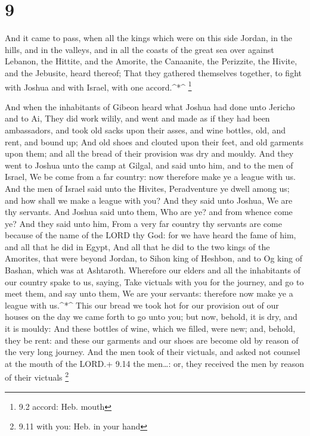 \hypertarget{section-8}{%
\section{9}\label{section-8}}

 And it came to pass, when all the kings which were on this
side Jordan, in the hills, and in the valleys, and in all the coasts of
the great sea over against Lebanon, the Hittite, and the Amorite, the
Canaanite, the Perizzite, the Hivite, and the Jebusite, heard thereof;
 That they gathered themselves together, to fight with
Joshua and with Israel, with one accord.\^{}*\^{} \footnote{9.2 accord:
  Heb. mouth}

 And when the inhabitants of Gibeon heard what Joshua had
done unto Jericho and to Ai,  They did work wilily, and went
and made as if they had been ambassadors, and took old sacks upon their
asses, and wine bottles, old, and rent, and bound up;  And
old shoes and clouted upon their feet, and old garments upon them; and
all the bread of their provision was dry and mouldy.  And
they went to Joshua unto the camp at Gilgal, and said unto him, and to
the men of Israel, We be come from a far country: now therefore make ye
a league with us.  And the men of Israel said unto the
Hivites, Peradventure ye dwell among us; and how shall we make a league
with you?  And they said unto Joshua, We are thy servants.
And Joshua said unto them, Who are ye? and from whence come ye?
 And they said unto him, From a very far country thy
servants are come because of the name of the LORD thy God: for we have
heard the fame of him, and all that he did in Egypt,  And
all that he did to the two kings of the Amorites, that were beyond
Jordan, to Sihon king of Heshbon, and to Og king of Bashan, which was at
Ashtaroth.  Wherefore our elders and all the inhabitants of
our country spake to us, saying, Take victuals with you for the journey,
and go to meet them, and say unto them, We are your servants: therefore
now make ye a league with us.\^{}*\^{}  This our bread we
took hot for our provision out of our houses on the day we came forth to
go unto you; but now, behold, it is dry, and it is mouldy: 
And these bottles of wine, which we filled, were new; and, behold, they
be rent: and these our garments and our shoes are become old by reason
of the very long journey.  And the men took of their
victuals, and asked not counsel at the mouth of the LORD.+ 9.14 the
men\ldots: or, they received the men by reason of their victuals
\footnote{9.11 with you: Heb. in your hand}

